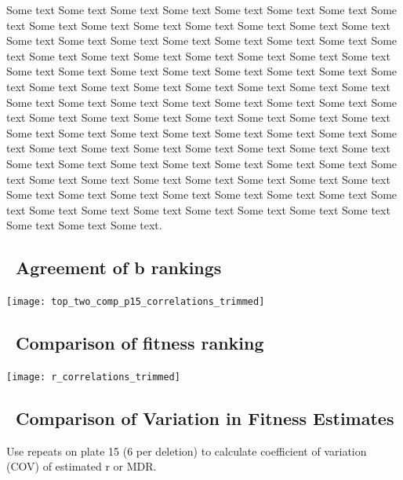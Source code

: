 \begin{multicols}{2}

  Some text Some text Some text Some text Some text Some text Some
  text Some text Some text Some text Some text Some text Some text
  Some text Some text Some text Some text Some text Some text Some
  text Some text Some text Some text Some text Some text Some text
  Some text Some text Some text Some text Some text Some text Some
  text Some text Some text Some text Some text Some text Some text
  Some text Some text Some text Some text Some text Some text Some
  text Some text Some text Some text Some text Some text Some text
  Some text Some text Some text Some text Some text Some text Some
  text Some text Some text Some text Some text Some text Some text
  Some text Some text Some text Some text Some text Some text Some
  text Some text Some text Some text Some text Some text Some text
  Some text Some text Some text Some text Some text Some text Some
  text Some text Some text Some text Some text Some text Some text
  Some text Some text Some text Some text Some text Some text Some
  text Some text Some text Some text Some text Some text Some text
  Some text Some text Some text Some text.

\subsection{\thesubsection~Agreement of b rankings}

\graphicspath{{images/correlation/}}
\begin{Figure}
  \centering
  \texttt{[image: top\_two\_comp\_p15\_correlations\_trimmed]}
  \label{fig:comp_b_ranking}
\end{Figure}

\subsection{\thesubsection~Comparison of fitness ranking}

\graphicspath{{images/correlation/}}
\begin{Figure}
  \centering
  \texttt{[image: r\_correlations\_trimmed]}
  \label{fig:r_ranking}
\end{Figure}

\subsection{\thesubsection~Comparison of Variation in Fitness Estimates}

Use repeats on plate 15 (6 per deletion) to calculate coefficient of
variation (COV) of estimated r or MDR.

\end{multicols}
